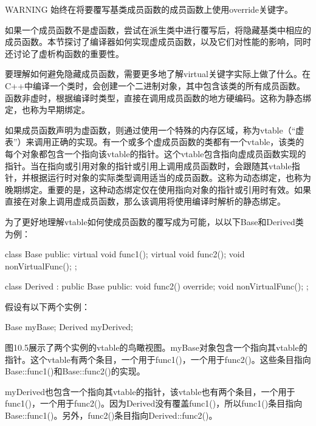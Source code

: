 \begin{myWarning}{WARNING}
始终在将要覆写基类成员函数的成员函数上使用override关键字。
\end{myWarning}


如果一个成员函数不是虚函数，尝试在派生类中进行覆写后，将隐藏基类中相应的成员函数。本节探讨了编译器如何实现虚成员函数，以及它们对性能的影响，同时还讨论了虚析构函数的重要性。


要理解如何避免隐藏成员函数，需要更多地了解virtual关键字实际上做了什么。在C++中编译一个类时，会创建一个二进制对象，其中包含该类的所有成员函数。函数非虚时，根据编译时类型，直接在调用成员函数的地方硬编码。这称为静态绑定，也称为早期绑定。

如果成员函数声明为虚函数，则通过使用一个特殊的内存区域，称为vtable（“虚表”）来调用正确的实现。有一个或多个虚成员函数的类都有一个vtable，该类的每个对象都包含一个指向该vtable的指针。这个vtable包含指向虚成员函数实现的指针。当在指向或引用对象的指针或引用上调用成员函数时，会跟随其vtable指针，并根据运行时对象的实际类型调用适当的成员函数。这称为动态绑定，也称为晚期绑定。重要的是，这种动态绑定仅在使用指向对象的指针或引用时有效。如果直接在对象上调用虚成员函数，那么该调用将使用编译时解析的静态绑定。

为了更好地理解vtable如何使成员函数的覆写成为可能，以以下Base和Derived类为例：

\begin{cpp}
class Base
{
    public:
        virtual void func1();
        virtual void func2();
        void nonVirtualFunc();
};

class Derived : public Base
{
    public:
        void func2() override;
        void nonVirtualFunc();
};
\end{cpp}

假设有以下两个实例：

\begin{cpp}
Base myBase;
Derived myDerived;
\end{cpp}

图10.5展示了两个实例的vtable的鸟瞰视图。myBase对象包含一个指向其vtable的指针。这个vtable有两个条目，一个用于func1()，一个用于func2()。这些条目指向Base::func1()和Base::func2()的实现。


myDerived也包含一个指向其vtable的指针，该vtable也有两个条目，一个用于func1()，一个用于func2()。因为Derived没有覆盖func1()，所以func1()条目指向Base::func1()。另外，func2()条目指向Derived::func2()。

